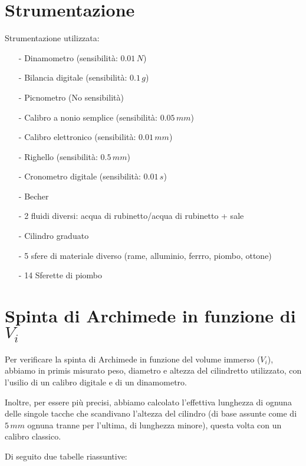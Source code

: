 \documentclass{article}
\begin{document}
\section{Strumentazione}
Strumentazione utilizzata: 
\begin{itemize}
    \item [-] Dinamometro \hfill (sensibilità: $0.01\,N$)
    \item [-] Bilancia digitale \hfill (sensibilità: $0.1\,g$)
    \item [-] Picnometro \hfill (No sensibilità)
    \item [-] Calibro a nonio semplice \hfill (sensibilità: $0.05\,mm$)
    \item [-] Calibro elettronico \hfill (sensibilità: $0.01\,mm$)
    \item [-] Righello \hfill (sensibilità: $0.5\,mm$)
    \item [-] Cronometro digitale \hfill (sensibilità: $0.01\,s$)
    \item [-] Becher
    \item [-] 2 fluidi diversi: acqua di rubinetto/acqua di rubinetto + sale
    \item [-] Cilindro graduato 
    \item [-] 5 sfere di materiale diverso (rame, alluminio, ferrro, piombo, ottone)
    \item [-] 14 Sferette di piombo 
\end{itemize}
\vspace{0.5cm}
\section{Spinta di Archimede in funzione di $V_i$}
Per verificare la spinta di Archimede in funzione del volume immerso ($V_i$), abbiamo in primis misurato peso, diametro e altezza del cilindretto utilizzato, con l'usilio di un calibro digitale e di un dinamometro.

Inoltre, per essere più precisi, abbiamo calcolato l'effettiva lunghezza di ognuna delle singole tacche che scandivano l'altezza del cilindro (di base assunte come di $5\,mm$ ognuna tranne per l'ultima, di lunghezza minore), questa volta con un calibro classico.

Di seguito due tabelle riassuntive: 
\end{document}
